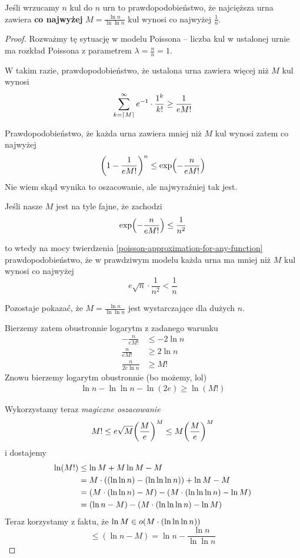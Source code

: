 \begin{theorem}[Lemat 5.12 P\&C]
	Jeśli wrzucamy \( n \) kul do \( n \) urn
	to prawdopodobieństwo, że najcięższa urna zawiera \textbf{co najwyżej} \( M = \frac{\ln n}{\ln \ln n} \) kul wynosi co najwyżej \( \frac{1}{n} \).
\end{theorem}
\begin{proof}
	Rozważmy tę sytuację w modelu Poissona -- liczba kul w ustalonej urnie ma rozkład Poissona z parametrem \( \lambda = \frac{n}{n} = 1 \).

	W takim razie, prawdopodobieństwo, że ustalona urna zawiera więcej niż \( M \) kul wynosi
	\[
		\sum_{k=\left\lceil M\right\rceil}^\infty e^{-1} \cdot \frac{1^k}{k!} \geq \frac{1}{eM!}
	\]

	Prawdopodobieństwo, że każda urna zawiera mniej niż \( M \) kul wynosi zatem co najwyżej
	\[
		\pars{1 - \frac{1}{eM!}}^n \leq \exp\pars{-\frac{n}{eM!}}
	\]
	Nie wiem skąd wynika to oszacowanie, ale najwyraźniej tak jest.

	Jeśli nasze \( M \) jest na tyle fajne, że zachodzi
	\[
		\exp\pars{-\frac{n}{eM!}} \leq \frac{1}{n^2}
	\]

	to wtedy na mocy twierdzenia \ref{poisson-approximation-for-any-function}
	prawdopodobieństwo, że w prawdziwym modelu każda urna ma mniej niż \( M \) kul wynosi co najwyżej
	\[
		e \sqrt{n} \cdot \frac{1}{n^2} < \frac{1}{n}
	\]

	Pozostaje pokazać, że \( M = \frac{\ln n}{\ln \ln n} \) jest wystarczające dla dużych \( n \).

	Bierzemy zatem obustronnie logarytm z zadanego warunku
	\begin{align*}
		-\frac{n}{eM!}     & \leq -2\ln n \\
		\frac{n}{eM!}      & \geq 2 \ln n \\
		\frac{n}{2e \ln n} & \geq M!
	\end{align*}
	Znowu bierzemy logarytm obustronnie (bo możemy, lol)
	\begin{align*}
		\ln n - \ln \ln n - \ln (2e) \geq \ln (M!)
	\end{align*}

	Wykorzystamy teraz \textit{magiczne oszacowanie}
	\[ M! \leq e\sqrt{M}\pars{\frac{M}{e}}^M \leq M\pars{\frac{M}{e}}^M \]
	i dostajemy
	\begin{align*}
		\ln (M!)
		 & \leq \ln M + M \ln M - M                                                  \\
		 & = M \cdot \left((\ln \ln n) - (\ln \ln \ln n)\right) + \ln M - M                \\
		 & = \left(M \cdot (\ln \ln n) - M\right) - \left(M \cdot (\ln \ln \ln n) - \ln M\right) \\
		 & = (\ln n - M) - \left(M \cdot (\ln \ln \ln n) - \ln M\right)                    \\
	\end{align*}
	Teraz korzystamy z faktu, że \( \ln M \in o\pars{M \cdot (\ln \ln \ln n)} \)
	\[
		\leq (\ln n - M) = \ln n - \frac{\ln n}{\ln \ln n}
	\]


\end{proof}
